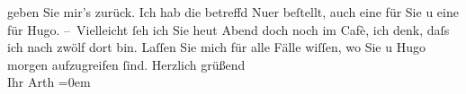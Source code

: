 \begin{ledgroupsized}[t]{13cm}
               geben Sie mir’s zurück. Ich hab die betreffd Nu{\geminationm}er
               beſtellt, auch eine für Sie u eine für Hugo.\pend
           \pstart
           {\pb}– Vielleicht ſeh ich Sie heut Abend doch noch im
               Cafè, ich denk, daſs ich nach zwölf dort bin. Laſſen Sie mich für alle
               Fälle wiſſen, wo Sie u Hugo morgen {\pb}aufzugreifen ſind.\pend
           \pstart
           Herzlich grüßend{\\[\baselineskip]}Ihr \spacefill\mbox{Arth}\pend
           \leftskip=0em{}
         
         \endnumbering{}\end{ledgroupsized}  \newcommand{\dateiname}{L00414}\newcommand{\titel}{Arthur Schnitzler an Richard Beer-Hofmann, [28.  3. 1895?]}\newcommand{\editorInnen}{Martin Anton Müller und Gerd-Hermann Susen}
      